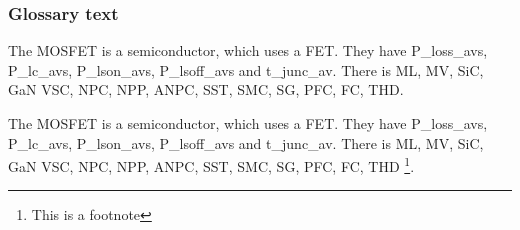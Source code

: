 \begin{frame}[allowframebreaks]
	\frametitle{Glossary text}%
    The \gls{MOSFET} is a semiconductor, which uses a \gls{FET}. They have \glspl{P_loss_av}, \glspl{P_lc_av}, \glspl{P_lson_av}, \glspl{P_lsoff_av}  and \gls{t_junc_av}. There is \gls{ML}, \gls{MV}, \gls{SiC}, \gls{GaN} \gls{VSC}, \gls{NPC}, \gls{NPP}, \gls{ANPC}, \gls{SST}, \gls{SMC}, \gls{SG}, \gls{PFC}, \gls{FC}, \gls{THD}.

    The \gls{MOSFET} is a semiconductor, which uses a \gls{FET}. They have \glspl{P_loss_av}, \glspl{P_lc_av}, \glspl{P_lson_av}, \glspl{P_lsoff_av}  and \gls{t_junc_av}. There is \gls{ML}, \gls{MV}, \gls{SiC}, \gls{GaN} \gls{VSC}, \gls{NPC}, \gls{NPP}, \gls{ANPC}, \gls{SST}, \gls{SMC}, \gls{SG}, \gls{PFC}, \gls{FC}, \gls{THD} \footnote{This is a footnote}.
\end{frame}